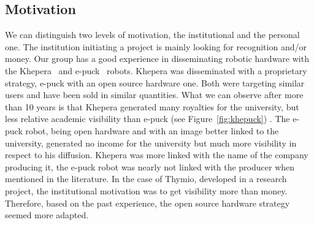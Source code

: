 \documentclass[letterpaper, 10 pt, conference]{ieeeconf}  %
\begin{document}
\subsection{Motivation}

We can distinguish two levels of motivation, the institutional and the personal one.
The institution initiating a project is mainly looking for recognition and/or money. 
Our group has a good experience in disseminating robotic hardware with the Khepera~\cite{MonFraIen93} and e-puck~\cite{mondada2009puck} robots.
Khepera was disseminated with a proprietary strategy, e-puck with an open source hardware one.
Both were targeting similar users and have been sold in similar quantities.
What we can observe after more than 10 years is that Khepera generated many royalties for the university, but less relative academic visibility than e-puck (see Figure~\ref{fig:khepuck}) .
The e-puck robot, being open hardware and with an image better linked to the university, generated no income for the university but much more visibility in respect to his diffusion.
Khepera was more linked with the name of the company producing it, the e-puck robot was nearly not linked with the producer when mentioned in the literature.
In the case of Thymio, developed in a research project, the institutional motivation was to get visibility more than money. 
Therefore, based on the past experience, the open source hardware strategy seemed more adapted.
\end{document}
